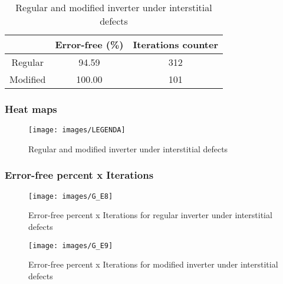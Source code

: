 \begin{table}[h]
\begin{center}
\begin{tabular}{|c|c|c|}
\hline
 & Error-free (\%) & Iterations counter \\
\hline
 Regular & 94.59 & 312 \\
\hline
 Modified & 100.00 & 101 \\
\hline

\end{tabular}
\caption{Regular and modified inverter under interstitial defects}
\end{center}
\end{table}

\subsubsection{Heat maps}

\begin{figure}[h]
\center
{}
\hfill
{}
\linebreak
{\texttt{[image: images/LEGENDA]}
}
\caption{Regular and modified inverter under interstitial defects}
\label{figure:inverter_t4}
\end{figure}

\subsubsection{Error-free percent x Iterations}

\begin{figure}[h!]
\center
\texttt{[image: images/G\_E8]}
\caption{Error-free percent x Iterations for regular inverter under interstitial defects}
\label{figure:inverter_reg_gt4}
\end{figure}

\begin{figure}[h!]
\center
\texttt{[image: images/G\_E9]}
\caption{Error-free percent x Iterations for modified inverter under interstitial defects}
\label{figure:inverter_mod_gt4}
\end{figure}


